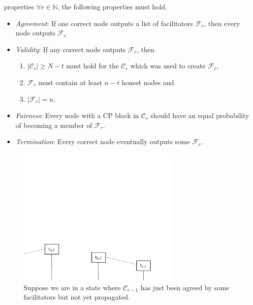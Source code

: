 \documentclass{beamer}
\newcommand{\C}{\mathcal{C}}
\newcommand{\F}{\mathcal{F}}
\begin{document}
\begin{frame}{\subsecname properties}
\label{def:consensus}
$\forall r \in \mathbb{N}$, the following properties must hold.
\begin{itemize}
    \item \emph{Agreement}:
        If one correct node outputs a list of facilitators $\F_r$,
        then every node outputs $\F_r$
    \item \emph{Validity}:
        If any correct node outputs $\F_r$, then 
            \begin{enumerate}
                \item $|\C_r| \ge N - t$ must hold for the $\C_r$ which was used to create $\F_r$,
                \item $\F_r$ must contain at least $n - t$ honest nodes and
                \item $|\F_r| = n$.
            \end{enumerate}
    \item \emph{Fairness}:
        Every node with a CP block in $\C_r$ should have an equal probability of becoming a member of $\F_r$.
    \item \emph{Termination}:
        Every correct node eventually outputs some $\F_r$.
\end{itemize}
\end{frame}

\begin{frame}{\subsecname}
  \begin{figure}[h]
  \includegraphics[width=0.7\textwidth]{trustchain-1}
  \centering
  \caption{Suppose we are in a state where $\mathcal{C}_{r - 1}$ has just been agreed by some facilitators but not yet propagated.}
  \end{figure}
\end{frame}
\end{document}
